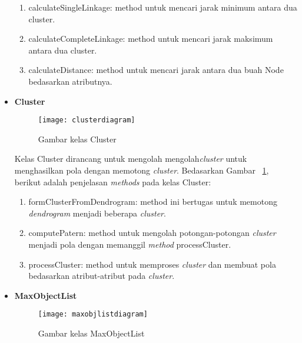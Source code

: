 \begin{itemize}
\begin{enumerate}
\item calculateSingleLinkage: method untuk mencari jarak minimum antara dua cluster.

\item calculateCompleteLinkage: method untuk mencari jarak maksimum antara dua cluster.

\item calculateDistance: method untuk mencari jarak antara dua buah Node bedasarkan atributnya.\\
 
\end{enumerate}


\item \textbf{Cluster}\\

\begin{figure}[H]
    \centering  
    \texttt{[image: clusterdiagram]}  
    \caption[Gambar kelas Cluster]{Gambar kelas Cluster} 
    \label{fig:clusterdiagram} 
\end{figure}

Kelas Cluster dirancang untuk mengolah mengolah\textit{cluster} untuk menghasilkan pola dengan memotong \textit{cluster}. Bedasarkan Gambar ~\ref{fig:clusterdiagram}, berikut adalah penjelasan \textit{methods} pada kelas Cluster:

\begin{enumerate}

\item formClusterFromDendrogram: method ini bertugas untuk memotong \textit{dendrogram} menjadi beberapa \textit{cluster}.

\item computePatern: method untuk mengolah potongan-potongan \textit{cluster} menjadi pola dengan memanggil \textit{method} processCluster.

\item processCluster: method untuk memproses \textit{cluster} dan membuat pola bedasarkan atribut-atribut pada \textit{cluster}.\\
 
\end{enumerate}


\item \textbf{MaxObjectList}\\

\begin{figure}[H]
    \centering  
    \texttt{[image: maxobjlistdiagram]}  
    \caption[Gambar kelas MaxObjectList]{Gambar kelas MaxObjectList} 
    \label{fig:maxobjlistdiagram} 
\end{figure}


\end{itemize}
